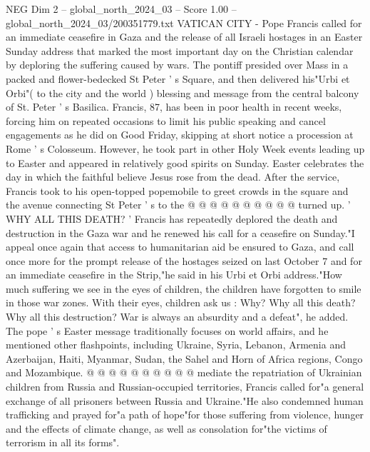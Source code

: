 \begin{textsample}{NEG Dim 2 – global\_north\_2024\_03 – Score 1.00 – global\_north\_2024\_03/200351779.txt}  \label{ex:f2_neg_079}
VATICAN CITY - Pope Francis called for an immediate ceasefire in Gaza and the release of all Israeli hostages in an Easter Sunday address that marked the most important day on the Christian calendar by deploring the suffering caused by wars.
The pontiff presided over Mass in a packed and flower-bedecked St Peter ' s Square, and then delivered his"Urbi et Orbi"( to the city and the world ) blessing and message from the central balcony of St.
Peter ' s Basilica.
Francis, 87, has been in poor health in recent weeks, forcing him on repeated occasions to limit his public speaking and cancel engagements as he did on Good Friday, skipping at short notice a procession at Rome ' s Colosseum.
However, he took part in other Holy Week events leading up to Easter and appeared in relatively good spirits on Sunday.
Easter celebrates the day in which the faithful believe Jesus rose from the dead.
After the service, Francis took to his open-topped popemobile to greet crowds in the square and the avenue connecting St Peter ' s to the @ @ @ @ @ @ @ @ @ @ turned up. ' WHY ALL THIS DEATH? ' Francis has repeatedly deplored the death and destruction in the Gaza war and he renewed his call for a ceasefire on Sunday."I appeal once again that access to humanitarian aid be ensured to Gaza, and call once more for the prompt release of the hostages seized on last October 7 and for an immediate ceasefire in the Strip,"he said in his Urbi et Orbi address."How much suffering we see in the eyes of children, the children have forgotten to smile in those war zones.
With their eyes, children ask us : Why?
Why all this death?
Why all this destruction?
War is always an absurdity and a defeat", he added.
The pope ' s Easter message traditionally focuses on world affairs, and he mentioned other flashpoints, including Ukraine, Syria, Lebanon, Armenia and Azerbaijan, Haiti, Myanmar, Sudan, the Sahel and Horn of Africa regions, Congo and Mozambique. @ @ @ @ @ @ @ @ @ @ mediate the repatriation of Ukrainian children from Russia and Russian-occupied territories, Francis called for"a general exchange of all prisoners between Russia and Ukraine."He also condemned human trafficking and prayed for"a path of hope"for those suffering from violence, hunger and the effects of climate change, as well as consolation for"the victims of terrorism in all its forms".

\end{textsample}
